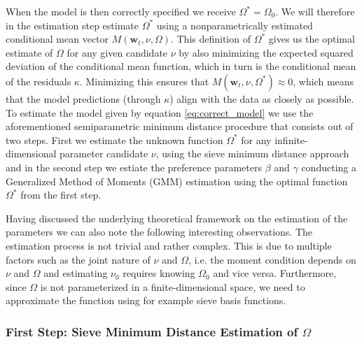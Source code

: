 \documentclass[12pt,a4paper]{article}
\begin{document}
		When the model is then correctly specified we receive $\Omega^* = \Omega_0$. We will therefore in the estimation step estimate $\Omega^*$ using a nonparametrically estimated conditional mean vector $M(\textbf{w}_t, \nu, \Omega)$. This definition of $\Omega^*$ gives us the optimal estimate of $\Omega$ for any given candidate $\nu$ by also minimizing the expected squared deviation of the conditional mean function, which in turn is the conditional mean of the residuals $\kappa$. Minimizing this ensures that $M(\textbf{w}_t, \nu, \Omega^*) \approx 0$, which means that the model predictions (through $\kappa$) align with the data as closely as possible. 
		To estimate the model given by equation \ref{eq:correct_model} we use the aforementioned semiparametric minimum distance procedure that consists out of two steps. First we estimate the unknown function $\Omega^*$ for any infinite-dimensional parameter candidate $\nu$, using the sieve minimum distance approach and in the second step we estiate the preference parameters $\beta$ and $\gamma$ conducting a Generalized Method of Moments (GMM) estimation using the optimal function $\Omega^*$ from the first step. 
		
		Having discussed the underlying theoretical framework on the estimation of the parameters we can also note the following interesting observations. The estimation process is not trivial and rather complex. This is due to multiple factors such as the joint nature of $\nu$ and $\Omega$, i.e. the moment condition depends on $\nu$ and $\Omega$ and estimating $\nu_0$ requires knowing $\Omega_0$ and vice versa. Furthermore, since $\Omega$ is not parameterized in a finite-dimensional space, we need to approximate the function using for example sieve basis functions.
		
		
		
	
	
		\subsubsection{First Step: Sieve Minimum Distance Estimation of $\Omega$}
		
\end{document}
